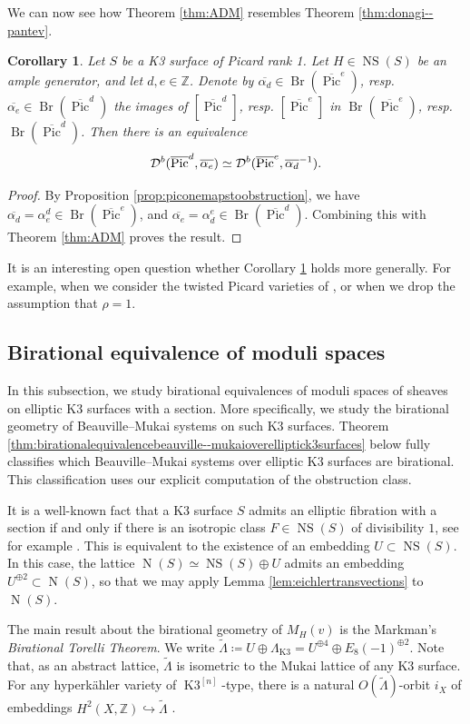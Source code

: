 \documentclass[11pt,twoside]{amsart}
\numberwithin{equation}{section}
\newtheorem{corollary}[dummy]{Corollary}
\theoremstyle{definition}
\theoremstyle{plain}
\newcommand{\Z}{\ensuremath{\mathbb{Z}}}
\newcommand{\klat}{\ensuremath{\Lambda_{\operatorname{K3}}}}
\def\Db{\calD^{b}}
\def\NS{\operatorname{NS}}
\def\olPic{\overline{\operatorname{Pic}}}
\def\Br{\operatorname{Br}}
\def\Kn{{\ensuremath{\operatorname{K3}^{[n]}}}}
\def\ol{\overline}
\def\N{\operatorname{N}}
\begin{document}
We can now see how Theorem \ref{thm:ADM} resembles Theorem \ref{thm:donagi--pantev}. 

\begin{corollary}\label{cor:adm=dp}
    Let $S$ be a K3 surface of Picard rank 1. Let $H\in \NS(S)$ be an ample generator, and let $d,e\in \Z$. Denote by $\overline{\alpha_d}\in \Br(\olPic^e)$, resp. $\ol{\alpha_e}\in \Br(\olPic^d)$ the images of $[\olPic^d]$, resp. $[\olPic^e]$ in $\Br(\olPic^e)$, resp. $\Br(\olPic^d)$. Then there is an equivalence $$\Db(\olPic^d,\ol{\alpha_e})\simeq \Db(\olPic^e,\ol{\alpha_d}^{-1}).$$
\end{corollary}
\begin{proof}
By Proposition \ref{prop:piconemapstoobstruction}, we have $\ol{\alpha_d} = \alpha_e^d\in \Br(\olPic^e)$, and $\ol{\alpha_e} = \alpha_d^e\in \Br(\olPic^d)$. Combining this with Theorem \ref{thm:ADM} proves the result.
\end{proof}

It is an interesting open question whether Corollary \ref{cor:adm=dp} holds more generally. For example, when we consider the twisted Picard varieties of \cite{HM23}, or when we drop the assumption that $\rho = 1$. 

\subsection{Birational equivalence of moduli spaces}
In this subsection, we study birational equivalences of moduli spaces of sheaves on elliptic K3 surfaces with a section. More specifically, we study the birational geometry of Beauville--Mukai systems on such K3 surfaces. Theorem \ref{thm:birationalequivalencebeauville--mukaioverelliptick3surfaces} below fully classifies which Beauville--Mukai systems over elliptic K3 surfaces are birational. This classification uses our explicit computation of the obstruction class. 

It is a well-known fact that a K3 surface $S$ admits an elliptic fibration with a section if and only if there is an isotropic class $F\in \NS(S)$ of divisibility $1$, see for example \cite[Remark 3.2.13 and \S11.4]{Huy16}. This is equivalent to the existence of an embedding $U\subset \NS(S)$. In this case, the lattice $\N(S) \simeq \NS(S)\oplus U$ admits an embedding $U^{\oplus2}\subset \N(S)$, so that we may apply Lemma \ref{lem:eichlertransvections} to $\N(S)$.

The main result about the birational geometry of $M_H(v)$ is the Markman's \textit{Birational Torelli Theorem}. We write $\tilde{\Lambda}\coloneqq U\oplus \klat = U^{\oplus 4}\oplus E_8(-1)^{\oplus 2}$. Note that, as an abstract lattice, $\tilde{\Lambda}$ is isometric to the Mukai lattice of any K3 surface. For any hyperk\"ahler variety of \Kn-type, there is a natural $O(\tilde{\Lambda})$-orbit $i_X$ of embeddings $H^2(X,\Z)\hookrightarrow \tilde{\Lambda}$ \cite{Mar11}. 
\end{document}
